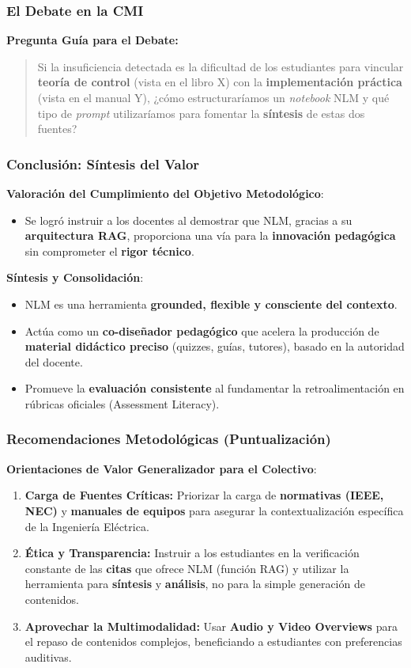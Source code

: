 \documentclass[aspectratio=43]{beamer}
\begin{document}
\begin{frame}
\frametitle{ El Debate en la CMI}
\textbf{Pregunta Guía para el Debate:}
\begin{quote}
Si la insuficiencia detectada es la dificultad de los estudiantes para vincular \textbf{teoría de control} (vista en el libro X) con la \textbf{implementación práctica} (vista en el manual Y), ¿cómo estructuraríamos un \textit{notebook} NLM y qué tipo de \textit{prompt} utilizaríamos para fomentar la \textbf{síntesis} de estas dos fuentes?
\end{quote}
\end{frame}


\begin{frame}
\frametitle{ Conclusión: Síntesis del Valor}

\textbf{Valoración del Cumplimiento del Objetivo Metodológico}:
\begin{itemize}
    \item Se logró instruir a los docentes al demostrar que NLM, gracias a su \textbf{arquitectura RAG}, proporciona una vía para la \textbf{innovación pedagógica} sin comprometer el \textbf{rigor técnico}.
\end{itemize}

\textbf{Síntesis y Consolidación}:
\begin{itemize}
    \item NLM es una herramienta \textbf{grounded, flexible y consciente del contexto}.
    \item Actúa como un \textbf{co-diseñador pedagógico} que acelera la producción de \textbf{material didáctico preciso} (quizzes, guías, tutores), basado en la autoridad del docente.
    \item Promueve la \textbf{evaluación consistente} al fundamentar la retroalimentación en rúbricas oficiales (Assessment Literacy).
\end{itemize}
\end{frame}

\begin{frame}
\frametitle{ Recomendaciones Metodológicas (Puntualización)}

\textbf{Orientaciones de Valor Generalizador para el Colectivo}:
\begin{enumerate}
    \item \textbf{Carga de Fuentes Críticas:} Priorizar la carga de \textbf{normativas (IEEE, NEC)} y \textbf{manuales de equipos} para asegurar la contextualización específica de la Ingeniería Eléctrica.
    \item \textbf{Ética y Transparencia:} Instruir a los estudiantes en la verificación constante de las \textbf{citas} que ofrece NLM (función RAG) y utilizar la herramienta para \textbf{síntesis} y \textbf{análisis}, no para la simple generación de contenidos.
    \item \textbf{Aprovechar la Multimodalidad:} Usar \textbf{Audio y Video Overviews} para el repaso de contenidos complejos, beneficiando a estudiantes con preferencias auditivas.
\end{enumerate}
\end{frame}
\end{document}
